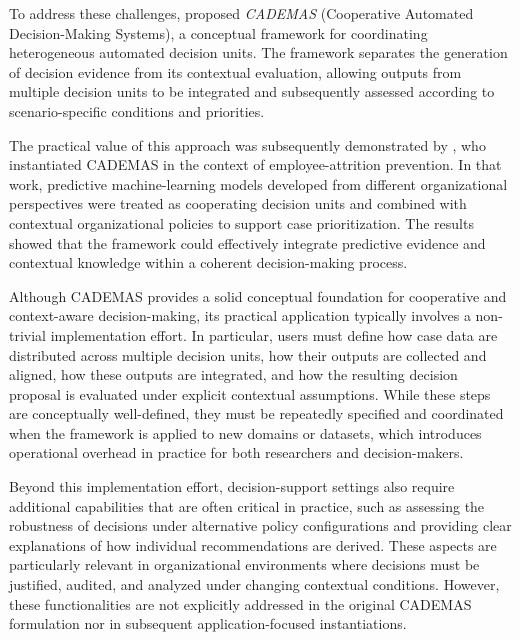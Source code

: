 \documentclass[]{article}
\begin{document}
To address these challenges, \citet{NovoaHernandez2026} proposed \textit{CADEMAS} (Cooperative Automated Decision-Making Systems), a conceptual framework for coordinating heterogeneous automated decision units. The framework separates the generation of decision evidence from its contextual evaluation, allowing outputs from multiple decision units to be integrated and subsequently assessed according to scenario-specific conditions and priorities.

The practical value of this approach was subsequently demonstrated by \citet{Godz2026}, who instantiated CADEMAS in the context of employee-attrition prevention. In that work, predictive machine-learning models developed from different organizational perspectives were treated as cooperating decision units and combined with contextual organizational policies to support case prioritization. The results showed that the framework could effectively integrate predictive evidence and contextual knowledge within a coherent decision-making process.

Although CADEMAS provides a solid conceptual foundation for cooperative and context-aware decision-making, its practical application typically involves a non-trivial implementation effort. In particular, users must define how case data are distributed across multiple decision units, how their outputs are collected and aligned, how these outputs are integrated, and how the resulting decision proposal is evaluated under explicit contextual assumptions. While these steps are conceptually well-defined, they must be repeatedly specified and coordinated when the framework is applied to new domains or datasets, which introduces operational overhead in practice for both researchers and decision-makers.

Beyond this implementation effort, decision-support settings also require additional capabilities that are often critical in practice, such as assessing the robustness of decisions under alternative policy configurations and providing clear explanations of how individual recommendations are derived. These aspects are particularly relevant in organizational environments where decisions must be justified, audited, and analyzed under changing contextual conditions. However, these functionalities are not explicitly addressed in the original CADEMAS formulation nor in subsequent application-focused instantiations.
\end{document}
